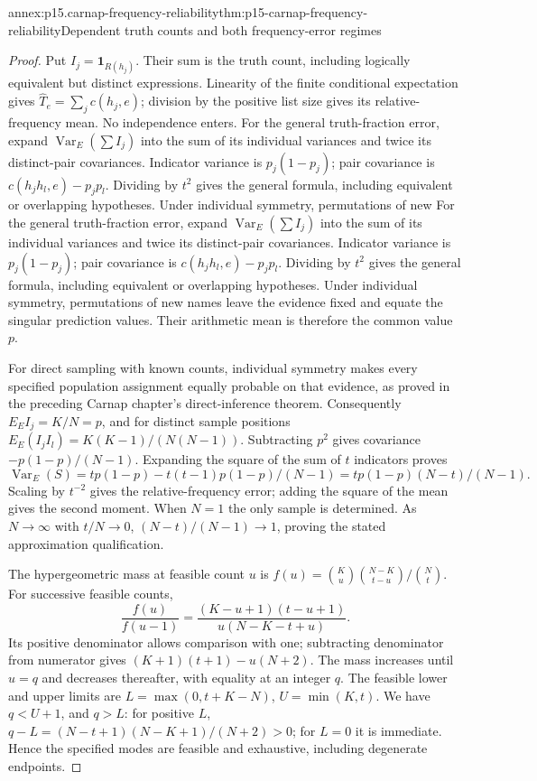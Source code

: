 \begin{annexitem}{annex:p15.carnap-frequency-reliability}{thm:p15-carnap-frequency-reliability}{Dependent truth counts and both frequency-error regimes}
\begin{proof}
Put \(I_j=\mathbf1_{R(h_j)}\). Their sum is the truth count,
including logically equivalent but distinct expressions. Linearity of
the finite conditional expectation gives \(\widehat T_e=\sum_jc(h_j,e)\);
division by the positive list size gives its relative-frequency mean.
No independence enters.
For the general truth-fraction error, expand
\(\operatorname{Var}_E(\sum I_j)\) into the sum of its individual
variances and twice its distinct-pair covariances. Indicator variance
is \(p_j(1-p_j)\); pair covariance is
\(c(h_jh_l,e)-p_jp_l\). Dividing by \(t^2\) gives the
general formula, including equivalent or overlapping hypotheses.
Under individual symmetry, permutations of new
For the general truth-fraction error, expand
\(\operatorname{Var}_E(\sum I_j)\) into the sum of its individual
variances and twice its distinct-pair covariances. Indicator variance
is \(p_j(1-p_j)\); pair covariance is
\(c(h_jh_l,e)-p_jp_l\). Dividing by \(t^2\) gives the
general formula, including equivalent or overlapping hypotheses.
Under individual symmetry, permutations of new
names leave the evidence fixed and equate the singular prediction
values. Their arithmetic mean is therefore the common value \(p\).

For direct sampling with known counts, individual symmetry makes every
specified population assignment equally probable on that evidence, as
proved in the preceding Carnap chapter's direct-inference theorem.
Consequently \(E_E I_j=K/N=p\), and for distinct sample positions
\(E_E(I_jI_l)=K(K-1)/(N(N-1))\). Subtracting \(p^2\) gives
covariance \(-p(1-p)/(N-1)\). Expanding the square of the sum
of \(t\) indicators proves
\[
 \operatorname{Var}_E(S)=tp(1-p)-t(t-1)p(1-p)/(N-1)
 =tp(1-p)(N-t)/(N-1).
\]
Scaling by \(t^{-2}\) gives the relative-frequency error; adding
the square of the mean gives the second moment. When \(N=1\)
the only sample is determined. As \(N\to\infty\) with
\(t/N\to0\), \((N-t)/(N-1)\to1\), proving the stated
approximation qualification.

The hypergeometric mass at feasible count \(u\) is
\(f(u)=\binom Ku\binom{N-K}{t-u}/\binom Nt\).
For successive feasible counts,
\[
 \frac{f(u)}{f(u-1)}=
 \frac{(K-u+1)(t-u+1)}{u(N-K-t+u)}.
\]
Its positive denominator allows comparison with one; subtracting
denominator from numerator gives
\((K+1)(t+1)-u(N+2)\). The mass increases until \(u=q\)
and decreases thereafter, with equality at an integer \(q\).
The feasible lower and upper limits are
\(L=\max(0,t+K-N)\), \(U=\min(K,t)\).
We have \(q<U+1\), and \(q>L\): for positive \(L\),
\(q-L=(N-t+1)(N-K+1)/(N+2)>0\); for \(L=0\) it is
immediate. Hence the specified modes are feasible and exhaustive,
including degenerate endpoints.


\end{proof}
\end{annexitem}
